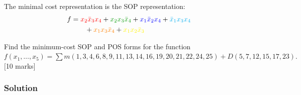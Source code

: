  The minimal cost representation is the SOP representation:
 \begin{align*}
   f &= { \cred x_2 \bx_3 x_4 } +  { \cg x_2 x_3 \bx_4} + {\cb x_1 \bx_2 x_4} +
       {\color{cyan} \bx_1 x_3 x_4 }
   \\
     &\qquad + {\color{orange} x_1 x_3 \bx_4} +
       {\color{yellow} x_1 x_2 \bx_3 }
 \end{align*}


\begin{prob}
  Find the minimum-cost SOP and POS forms for the function \\
  $f(x_1 , \dots, x_5) =
  \sum m(1, 3, 4, 6, 8, 9, 11, 13, 14, 16, 19, 20, 21, 22, 24, 25) + D(5, 7,
  12, 15, 17, 23).$  \cite[Prob 2.42]{brown2013fundamentals} [10 marks]
  \label{prob:prob10}
\end{prob}

\subsubsection*{Solution}


